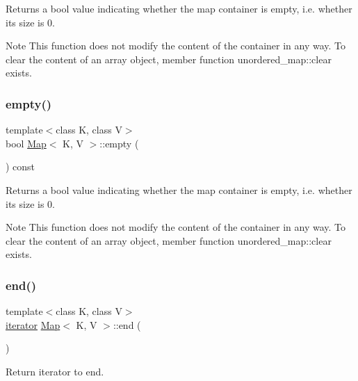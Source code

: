 Returns a bool value indicating whether the map container is empty, i.\+e. whether its size is 0. \begin{DoxyNote}{Note}
This function does not modify the content of the container in any way. To clear the content of an array object, member function unordered\+\_\+map\+::clear exists. 
\end{DoxyNote}
\mbox{\label{classMap_aabea9760ee5af9503c1230ad29cc4db7}} 
\subsubsection{\texorpdfstring{empty()}{empty()}\hspace{0.1cm}{\footnotesize\ttfamily [2/2]}}
{\footnotesize\ttfamily template$<$class K, class V$>$ \\
bool \hyperlink{classMap}{Map}$<$ K, V $>$\+::empty (\begin{DoxyParamCaption}{ }\end{DoxyParamCaption}) const\hspace{0.3cm}{\ttfamily [inline]}}

Returns a bool value indicating whether the map container is empty, i.\+e. whether its size is 0. \begin{DoxyNote}{Note}
This function does not modify the content of the container in any way. To clear the content of an array object, member function unordered\+\_\+map\+::clear exists. 
\end{DoxyNote}
\mbox{\label{classMap_af7192ef1dd6fb558c06442c00a4c516e}} 
\subsubsection{\texorpdfstring{end()}{end()}\hspace{0.1cm}{\footnotesize\ttfamily [1/4]}}
{\footnotesize\ttfamily template$<$class K, class V$>$ \\
\hyperlink{classMap_ad1f372a2028b9f46497e873b0e984e84}{iterator} \hyperlink{classMap}{Map}$<$ K, V $>$\+::end (\begin{DoxyParamCaption}{ }\end{DoxyParamCaption})\hspace{0.3cm}{\ttfamily [inline]}}

Return iterator to end. \mbox{\label{classMap_af7192ef1dd6fb558c06442c00a4c516e}} 
